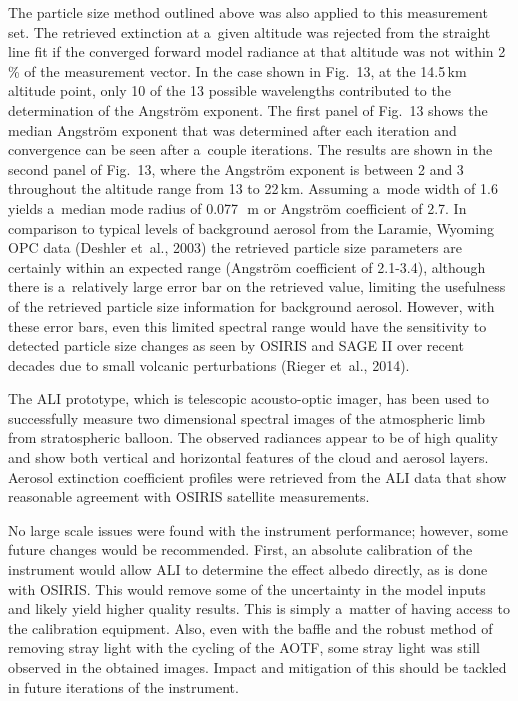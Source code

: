 \documentclass[amtd, online, hvmath]{copernicus}
\begin{document}
The particle size method outlined above was also applied to this
measurement set. The retrieved extinction at a~given altitude was
rejected from the straight line fit if the converged forward model
radiance at that altitude was not within 2\,{\%} of the measurement
vector. In the case shown in Fig.~13, at the 14.5\,\unit{km} altitude
point, only 10 of the 13 possible wavelengths contributed to the
determination of the Angstr\"{o}m exponent. The first panel of Fig.~13
shows the median Angstr\"{o}m exponent that was determined after each
iteration and convergence can be seen after a~couple iterations. The
results are shown in the second panel of Fig.~13, where the
Angstr\"{o}m exponent is between 2 and 3 throughout the altitude range
from 13 to 22\,\unit{km}. Assuming a~mode width of 1.6 yields a~median
mode radius of 0.077\,\unit{{\mu}m} or Angstr\"{o}m coefficient of 2.7. In comparison to typical levels
of background aerosol from the Laramie, Wyoming OPC data (Deshler
et~al., 2003) the retrieved particle size parameters are certainly
within an expected range (Angstr\"{o}m coefficient of 2.1-3.4), although there is a~relatively large error
bar on the retrieved value, limiting the usefulness of the retrieved
particle size information for background aerosol. However, with these
error bars, even this limited spectral range would have the
sensitivity to detected particle size changes as seen by OSIRIS and
SAGE II over recent decades due to small volcanic perturbations
(Rieger et~al., 2014).

\conclusions

The ALI prototype, which is telescopic acousto-optic imager, has been
used to successfully measure two dimensional spectral images of the
atmospheric limb from stratospheric balloon. The observed radiances
appear to be of high quality and show both vertical and horizontal
features of the cloud and aerosol layers. Aerosol extinction
coefficient profiles were retrieved from the ALI data that show
reasonable agreement with OSIRIS satellite measurements.

No large scale issues were found with the instrument performance;
however, some future changes would be recommended. First, an absolute
calibration of the instrument would allow ALI to determine the effect
albedo directly, as is done with OSIRIS. This would remove some of the
uncertainty in the model inputs and likely yield higher quality
results. This is simply a~matter of having access to the calibration
equipment. Also, even with the baffle and the robust method of
removing stray light with the cycling of the AOTF, some stray light
was still observed in the obtained images. Impact and mitigation of
this should be tackled in future iterations of the instrument.
\end{document}
